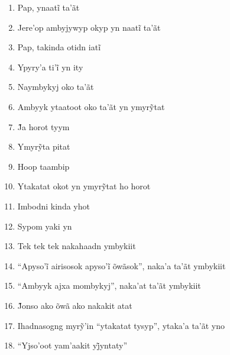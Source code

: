\begin{enumerate}
 \begin{center}\end{center}

 \item Pap, ynaatĩ ta’ãt

 \item Jere’op ambyjywyp okyp yn naatĩ ta’ãt

 \item Pap, takinda otidn iatĩ

 \item Ypyry’a ti’ĩ yn ity

 \item Naymbykyj oko ta'ãt

 \item Ambyyk ytaatoot oko ta’ãt yn ymyrỹtat

 \item J̃a horot tyym

 \item Ymyrỹta pitat

 \item Hoop taambip

 \item Ytakatat okot yn ymyrỹtat ho horot

 \item Imbodni kinda yhot

 \item Sypom yaki yn

 \begin{center}\end{center}

 \item Tek tek tek nakahaadn ymbykiit

 \item ``Apyso’ĩ airisosok apyso’ĩ õwãsok'', naka’a ta’ãt ymbykiit

 \item ``Ambyyk ajxa mombykyj'', naka'at ta'ãt ymbykiit

 \item J̃onso ako õwã ako nakakit atat

 \item Ihadnasogng myrỹ’in ``ytakatat tysyp'', ytaka’a ta’ãt yno

 \item ``Yjso’oot yam’aakit yj̃yntaty''

 \begin{center}\end{center}


\end{enumerate}
